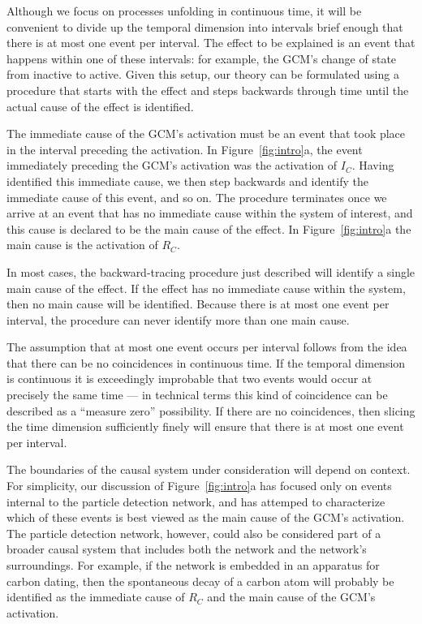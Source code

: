 \documentclass[10pt,letterpaper]{article}
\newcommand{\ev}[2]{$#1_#2$}
\begin{document}
Although we focus on processes unfolding in continuous time, it will be convenient to divide up the temporal dimension into intervals brief enough that there is at most one event per interval. The effect to be explained is an event that happens within one of these intervals: for example, the GCM's change of state from inactive to active. Given this setup, our theory can be formulated using a procedure that starts with the effect and steps backwards through time until the actual cause of the effect is identified.

The immediate cause of the GCM's activation must be an event that took place in the interval preceding the activation. In Figure~\ref{fig:intro}a, the event immediately preceding the GCM's activation was the activation of \ev{I}{C}. Having identified this immediate cause, we then step backwards and identify the immediate cause of this event, and so on.  The procedure terminates once we arrive at an event that has no immediate cause within the system of interest, 
and this cause is declared to be the main cause of the effect.  In Figure~\ref{fig:intro}a the main cause is the activation of \ev{R}{C}. 

In most cases, the backward-tracing procedure just described will identify a single main cause of the effect. If the effect has no immediate cause within the system, then no main cause will be identified. Because there is at most one event per interval, the procedure can never identify more than one main cause.

The assumption that at most one event occurs per interval follows from the idea that there can be no coincidences in continuous time. If the temporal dimension is continuous it is exceedingly improbable that two events would occur at precisely the same time --- in technical terms this kind of coincidence can be described as a ``measure zero'' possibility. If there are no coincidences, then slicing the time dimension sufficiently finely will ensure that there is at most one event per interval.

The boundaries of the causal system under consideration will depend on context. For simplicity, our discussion of Figure~\ref{fig:intro}a has focused only on events internal to the particle detection network, and has attemped to characterize which of these events is best viewed as the main cause of the GCM's activation. The particle detection network, however, could also be considered part of a broader causal system that includes both the network and the network's surroundings. For example, if the network is embedded in an apparatus for carbon dating, then the spontaneous decay of a carbon atom will probably be identified as the immediate cause of \ev{R}{C} and the main cause of the GCM's activation.
\end{document}
